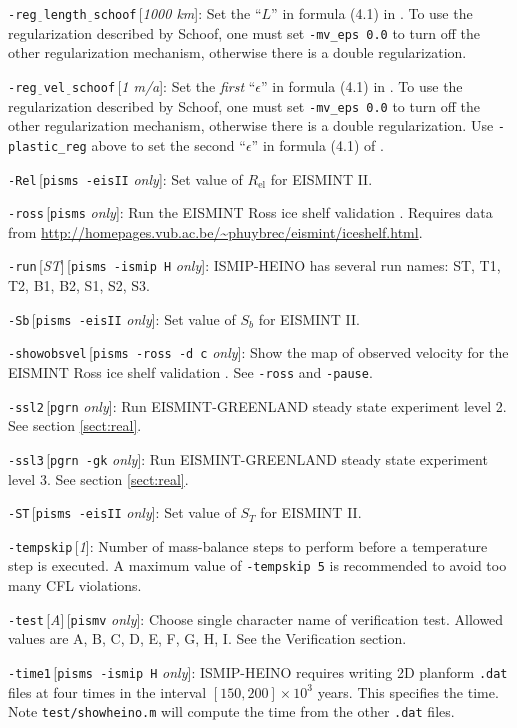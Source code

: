 \documentclass[11pt,final]{amsart}
\newcommand{\eps}{\epsilon}
\newcommand{\rawopt}[1]{\vspace{1mm}\noindent \Large\texttt{-#1}\normalsize}
\newcommand{\optdef}[2]{\rawopt{#1}\,[\textsl{#2}]:\quad}
\newcommand{\optrestrict}[2]{\rawopt{#1}\,[\texttt{#2} \textsl{only}]:\quad}
\newcommand{\optdefrestrict}[3]{\rawopt{#1}\,[\textsl{#2}]\,[\texttt{#3} \textsl{only}]:\quad}
\newcommand{\und}{$\underline{\,\,\,}$}
\begin{document}
\optdef{reg\und length\und schoof}{1000 km}  Set the ``$L$'' in formula (4.1) in \cite{SchoofStream}.  To use the regularization described by Schoof, one must set \verb|-mv_eps 0.0| to turn off the other regularization mechanism, otherwise there is a double regularization.

\optdef{reg\und vel\und schoof}{1 m/a}  Set the \emph{first} ``$\eps$'' in formula (4.1) in \cite{SchoofStream}.  To use the regularization described by Schoof, one must set \verb|-mv_eps 0.0| to turn off the other regularization mechanism, otherwise there is a double regularization.  Use \verb|-plastic_reg| above to set the second ``$\eps$'' in formula (4.1) of \cite{SchoofStream}.

\optrestrict{Rel}{pisms -eisII}    Set value of $R_{\text{el}}$ for EISMINT II.

\optrestrict{ross}{pisms}    Run the EISMINT Ross ice shelf validation \cite{MacAyealetal}.  Requires data from \url{http://homepages.vub.ac.be/~phuybrec/eismint/iceshelf.html}.

\optdefrestrict{run}{ST}{pisms -ismip H}  ISMIP-HEINO has several run names: ST, T1, T2, B1, B2, S1, S2, S3.

\optrestrict{Sb}{pisms -eisII}    Set value of $S_b$ for EISMINT II.

\optrestrict{showobsvel}{pisms -ross -d c}    Show the map of observed velocity for the EISMINT Ross ice shelf validation \cite{MacAyealetal}.  See \verb|-ross| and \verb|-pause|.

\optrestrict{ssl2}{pgrn}    Run EISMINT-GREENLAND steady state experiment level 2. See section \ref{sect:real}.

\optrestrict{ssl3}{pgrn -gk}    Run EISMINT-GREENLAND steady state experiment level 3. See section \ref{sect:real}.

\optrestrict{ST}{pisms -eisII}    Set value of $S_T$ for EISMINT II.

\optdef{tempskip}{1}  Number of mass-balance steps to perform before a temperature step is executed.  A maximum value of \verb|-tempskip 5| is recommended to avoid too many CFL violations.

\optdefrestrict{test}{A}{pismv}  Choose single character name of verification test.  Allowed values are A, B, C, D, E, F, G, H, I.  See the Verification section.

\optrestrict{time1}{pisms -ismip H}  ISMIP-HEINO requires writing 2D planform \verb|.dat| files at four times in the interval $[150,200]\times 10^{3}$ years.  This specifies the time.  Note \verb|test/showheino.m| will compute the time from the other \verb|.dat| files.
\end{document}
